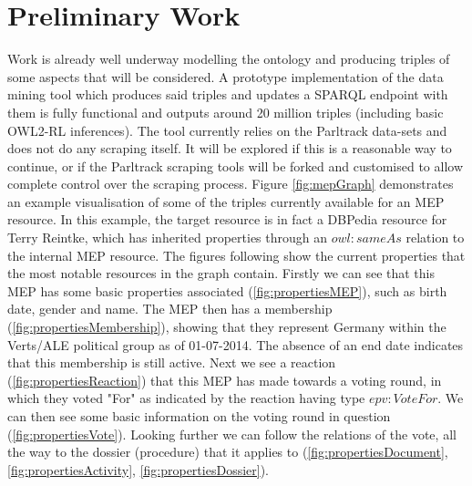 \documentclass{article}
\begin{document}
\section{Preliminary Work}
Work is already well underway modelling the ontology and producing triples of some aspects that will be considered. A prototype implementation of the data mining tool which produces said triples and updates a SPARQL endpoint with them is fully functional and outputs around 20 million triples (including basic OWL2-RL inferences). The tool currently relies on the Parltrack data-sets and does not do any scraping itself. It will be explored if this is a reasonable way to continue, or if the Parltrack scraping tools will be forked and customised to allow complete control over the scraping process.
\newline
Figure \ref{fig:mepGraph} demonstrates an example visualisation of some of the triples currently available for an MEP resource. In this example, the target resource is in fact a DBPedia resource for Terry Reintke, which has inherited properties through an $owl:sameAs$ relation to the internal MEP resource. The figures following show the current properties that the most notable resources in the graph contain. 
\newline
Firstly we can see that this MEP has some basic properties associated (\ref{fig:propertiesMEP}), such as birth date, gender and name. The MEP then has a membership (\ref{fig:propertiesMembership}), showing that they represent Germany within the Verts/ALE political group as of 01-07-2014. The absence of an end date indicates that this membership is still active. Next we see a reaction (\ref{fig:propertiesReaction}) that this MEP has made towards a voting round, in which they voted "For" as indicated by the reaction having type $epv:VoteFor$. We can then see some basic information on the voting round in question (\ref{fig:propertiesVote}). Looking further we can follow the relations of the vote, all the way to the dossier (procedure) that it applies to (\ref{fig:propertiesDocument}, \ref{fig:propertiesActivity}, \ref{fig:propertiesDossier}).
\end{document}
